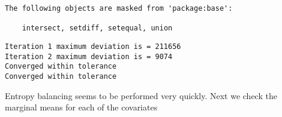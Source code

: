 \documentclass[
  letterpaper,
  DIV=11,
  numbers=noendperiod]{scrartcl}
\newenvironment{Shaded}{\begin{snugshade}}{\end{snugshade}}
\newcommand{\AttributeTok}[1]{\textcolor[rgb]{0.40,0.45,0.13}{#1}}
\newcommand{\ConstantTok}[1]{\textcolor[rgb]{0.56,0.35,0.01}{#1}}
\newcommand{\DecValTok}[1]{\textcolor[rgb]{0.68,0.00,0.00}{#1}}
\newcommand{\FunctionTok}[1]{\textcolor[rgb]{0.28,0.35,0.67}{#1}}
\newcommand{\NormalTok}[1]{\textcolor[rgb]{0.00,0.23,0.31}{#1}}
\newcommand{\OtherTok}[1]{\textcolor[rgb]{0.00,0.23,0.31}{#1}}
\newcommand{\SpecialCharTok}[1]{\textcolor[rgb]{0.37,0.37,0.37}{#1}}
\newcommand{\StringTok}[1]{\textcolor[rgb]{0.13,0.47,0.30}{#1}}
\begin{document}
\begin{verbatim}
The following objects are masked from 'package:base':

    intersect, setdiff, setequal, union
\end{verbatim}

\begin{Shaded}
\end{Shaded}

\begin{verbatim}
Iteration 1 maximum deviation is = 211656 
Iteration 2 maximum deviation is = 9074 
Converged within tolerance 
Converged within tolerance 
\end{verbatim}

Entropy balancing seems to be performed very quickly. Next we check the
marginal means for each of the covariates
\end{document}
